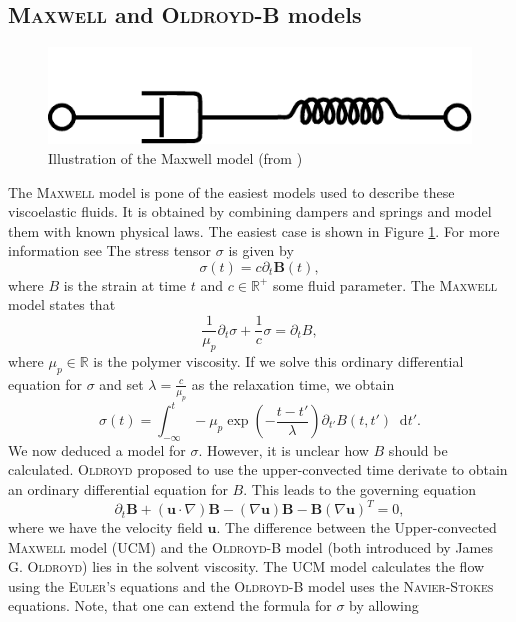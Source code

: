 \documentclass[12pt,a4paper,twoside, open=right]{scrreprt}
\theoremstyle{definition}
\theoremstyle{plain}
\newcommand{\rr}{\mathbb{R}}
\newcommand{\bfu}{\bm{u}}
\newcommand{\bfB}{\bm{B}}
\newcommand{\D}{\mathop{}\!\mathrm{d}}
\begin{document}
\subsection{\textsc{Maxwell} and \textsc{Oldroyd-B} models}
\begin{figure}
    \centering
    \includegraphics[width=\textwidth]{Maxwell_diagram.pdf}
    \caption{Illustration of the Maxwell model (from \cite{Pekaje})}
    \label{fig:maxwell}
\end{figure}
The \textsc{Maxwell} model is pone of the easiest models used to describe these viscoelastic fluids. It is obtained by combining dampers and springs and model them with known physical laws. The easiest case is shown in Figure \ref{fig:maxwell}. For more information see \cite{Owens2002} The stress tensor $\sigma$ is given by
\begin{equation}
    \sigma(t)=c\partial_t \bfB(t),
\end{equation}
where $B$ is the strain at time $t$ and $c\in\rr^+$ some fluid parameter. The \textsc{Maxwell} model states that
\begin{equation}
    \frac{1}{\mu_p}\partial_t\sigma +\frac{1}{c}\sigma = \partial_t B,
\end{equation}
where $\mu_p\in\rr$ is the polymer viscosity. If we solve this ordinary differential equation for $\sigma$ and set $\lambda = \frac{c}{\mu_p}$ as the relaxation time, we obtain
\begin{equation}
    \sigma(t)=\int_{-\infty}^{t}-\mu_p\exp\left(-\frac{t-t'}{\lambda}\right)\partial_{t'} B(t,t')\D t'.
\end{equation}
We now deduced a model for $\sigma$. However, it is unclear how $B$ should be calculated.
\textsc{Oldroyd} proposed to use the upper-convected time derivate to obtain an ordinary differential equation for $B$. This leads to the governing equation
\begin{equation}
    \partial_t \bfB  + (\bfu\cdot \nabla)\bfB-(\nabla \bfu)\bfB-\bfB(\nabla\bfu)^T=0,
\end{equation}
where we have the velocity field $\bfu$. The difference between the Upper-convected \textsc{Maxwell} model (UCM) and the \textsc{Oldroyd-B} model (both introduced by James G. \textsc{Oldroyd}) lies in the solvent viscosity. The UCM model calculates the flow using the \textsc{Euler's} equations and the \textsc{Oldroyd-B} model uses the \textsc{Navier-Stokes} equations. Note, that one can extend the formula for $\sigma$ by allowing
\end{document}
